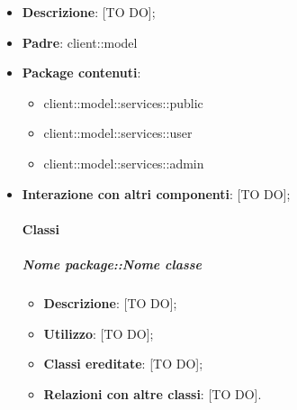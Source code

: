 \begin{itemize}
	\item \textbf{Descrizione}: [TO DO];
	\item \textbf{Padre}: client::model
	\item \textbf{Package contenuti}:
		\begin{itemize}
			\item client::model::services::public
			\item client::model::services::user
			\item client::model::services::admin
		\end{itemize}
	\item \textbf{Interazione con altri componenti}: [TO DO];
	
	\paragraph{Classi} %
		\subparagraph{Nome package::Nome classe} %
		\label{subp:subparagraph_name}
			\begin{itemize}
				\item \textbf{Descrizione}: [TO DO];
				\item \textbf{Utilizzo}: [TO DO];
				\item \textbf{Classi ereditate}: [TO DO];
				\item \textbf{Relazioni con altre classi}: [TO DO].
			\end{itemize}

\end{itemize}
